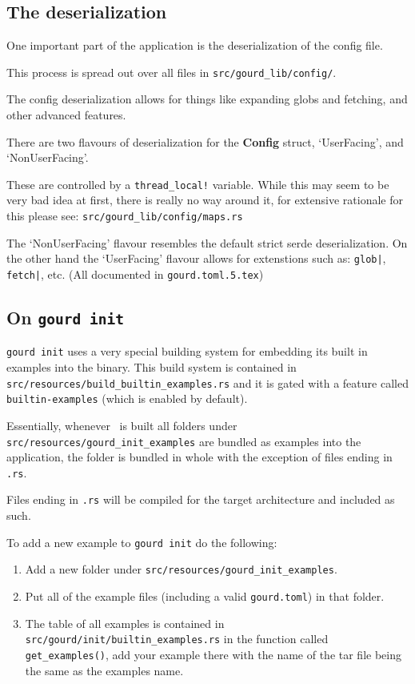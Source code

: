 \subsection{The deserialization}\label{sec:serde}

One important part of the application is the deserialization of the
config file.

This process is spread out over all files in \texttt{src/gourd\_lib/config/}.

The config deserialization allows for things like expanding globs and
fetching, and other advanced features.

There are two flavours of deserialization for the \textbf{Config} struct,
`UserFacing', and `NonUserFacing'.

These are controlled by a \texttt{thread\_local!} variable.
While this may seem to be very bad idea at first, there is really no way
around it, for extensive rationale for this please see:
\texttt{src/gourd\_lib/config/maps.rs}

The `NonUserFacing' flavour resembles the default strict serde deserialization.
On the other hand the `UserFacing' flavour allows for extenstions such as:
\texttt{glob|}, \texttt{fetch|}, etc. (All documented in \texttt{gourd.toml.5.tex})

\subsection{On \texttt{gourd init}}

\texttt{gourd init} uses a very special building system for embedding its
built in examples into the binary. This build system is contained
in \texttt{src/resources/build\_builtin\_examples.rs} and it is gated with
a feature called \texttt{builtin-examples} (which is enabled by default).

Essentially, whenever \gourd\ is built all folders under
\texttt{src/resources/gourd\_init\_examples} are bundled as examples into the
application, the folder is bundled in whole with the exception of files ending in \texttt{.rs}.

Files ending in \texttt{.rs} will be compiled for the target architecture and included
as such.

To add a new example to \texttt{gourd init} do the following:

\begin{enumerate}
  \item Add a new folder under \texttt{src/resources/gourd\_init\_examples}.
  \item Put all of the example files (including a valid \texttt{gourd.toml}) in that folder.
  \item The table of all examples is contained in \texttt{src/gourd/init/builtin\_examples.rs}
  in the function called \texttt{get\_examples()}, add your example there with the name
  of the tar file being the same as the examples name.
\end{enumerate}

